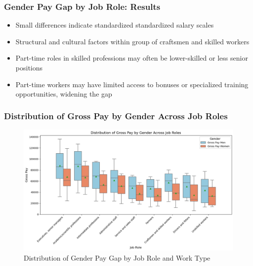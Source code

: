 \documentclass{beamer}
\begin{document}
\begin{frame}
\frametitle{Gender Pay Gap by Job Role: Results}
\begin{center}
  \begin{itemize}
    \item Small differences indicate standardized standardized salary scales
    \item Structural and cultural factors within group of craftsmen and skilled workers
    \item Part-time roles in skilled professions may often be lower-skilled or less senior positions
    \item Part-time workers may have limited access to bonuses or specialized training opportunities, widening the gap
\end{itemize} 
\end{center}
\end{frame}


\begin{frame}
\frametitle{Distribution of Gross Pay by Gender Across Job Roles}
\begin{center}
\begin{figure}[H]
    \includegraphics[width=\textwidth]{Figures/Distribution_Gross-Pay.png}
    \caption{Distribution of Gender Pay Gap by Job Role and Work Type}
    \label{fig:distribution_gross}
\end{figure}
\end{center}
\end{frame}
\end{document}
